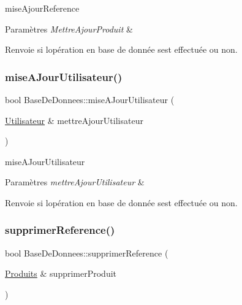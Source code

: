 mise\+Ajour\+Reference 


\begin{DoxyParams}{Paramètres}
{\em Mettre\+Ajour\+Produit} & \\
\hline
\end{DoxyParams}
\begin{DoxyReturn}{Renvoie}
si l\textquotesingle{}opération en base de donnée s\textquotesingle{}est effectuée ou non. 
\end{DoxyReturn}
\mbox{\label{class_base_de_donnees_a9c2bce97f39046e66b3dd3d08c2b911a}} 
\subsubsection{\texorpdfstring{mise\+A\+Jour\+Utilisateur()}{miseAJourUtilisateur()}}
{\footnotesize\ttfamily bool Base\+De\+Donnees\+::mise\+A\+Jour\+Utilisateur (\begin{DoxyParamCaption}\item[{\mbox{\hyperlink{class_utilisateur}{Utilisateur}} \&}]{mettre\+Ajour\+Utilisateur }\end{DoxyParamCaption})}



mise\+A\+Jour\+Utilisateur 


\begin{DoxyParams}{Paramètres}
{\em mettre\+Ajour\+Utilisateur} & \\
\hline
\end{DoxyParams}
\begin{DoxyReturn}{Renvoie}
si l\textquotesingle{}opération en base de donnée s\textquotesingle{}est effectuée ou non. 
\end{DoxyReturn}
\mbox{\label{class_base_de_donnees_a824bea64c3ef77eff0e4334a617b36c8}} 
\subsubsection{\texorpdfstring{supprimer\+Reference()}{supprimerReference()}}
{\footnotesize\ttfamily bool Base\+De\+Donnees\+::supprimer\+Reference (\begin{DoxyParamCaption}\item[{\mbox{\hyperlink{class_produits}{Produits}} \&}]{supprimer\+Produit }\end{DoxyParamCaption})}



